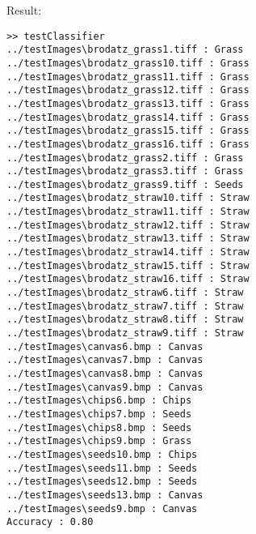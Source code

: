 \documentclass[a4paper,10pt]{article}
\begin{document}
Result:
\begin{lstlisting}[basicstyle=\small]
>> testClassifier
../testImages\brodatz_grass1.tiff : Grass
../testImages\brodatz_grass10.tiff : Grass
../testImages\brodatz_grass11.tiff : Grass
../testImages\brodatz_grass12.tiff : Grass
../testImages\brodatz_grass13.tiff : Grass
../testImages\brodatz_grass14.tiff : Grass
../testImages\brodatz_grass15.tiff : Grass
../testImages\brodatz_grass16.tiff : Grass
../testImages\brodatz_grass2.tiff : Grass
../testImages\brodatz_grass3.tiff : Grass
../testImages\brodatz_grass9.tiff : Seeds
../testImages\brodatz_straw10.tiff : Straw
../testImages\brodatz_straw11.tiff : Straw
../testImages\brodatz_straw12.tiff : Straw
../testImages\brodatz_straw13.tiff : Straw
../testImages\brodatz_straw14.tiff : Straw
../testImages\brodatz_straw15.tiff : Straw
../testImages\brodatz_straw16.tiff : Straw
../testImages\brodatz_straw6.tiff : Straw
../testImages\brodatz_straw7.tiff : Straw
../testImages\brodatz_straw8.tiff : Straw
../testImages\brodatz_straw9.tiff : Straw
../testImages\canvas6.bmp : Canvas
../testImages\canvas7.bmp : Canvas
../testImages\canvas8.bmp : Canvas
../testImages\canvas9.bmp : Canvas
../testImages\chips6.bmp : Chips
../testImages\chips7.bmp : Seeds
../testImages\chips8.bmp : Seeds
../testImages\chips9.bmp : Grass
../testImages\seeds10.bmp : Chips
../testImages\seeds11.bmp : Seeds
../testImages\seeds12.bmp : Seeds
../testImages\seeds13.bmp : Canvas
../testImages\seeds9.bmp : Canvas
Accuracy : 0.80
\end{lstlisting}
\end{document}
